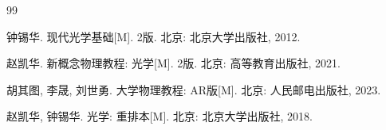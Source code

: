 \documentclass[12pt,a4paper,oneside]{report}
\theoremstyle{definition}
\theoremstyle{remark}
\begin{document}




\begin{thebibliography}{99}

钟锡华. 现代光学基础[M]. 2版. 北京: 北京大学出版社, 2012.

赵凯华. 新概念物理教程: 光学[M]. 2版. 北京: 高等教育出版社, 2021.

胡其图, 李晟, 刘世勇. 大学物理教程: AR版[M]. 北京: 人民邮电出版社, 2023.

赵凯华, 钟锡华. 光学: 重排本[M]. 北京: 北京大学出版社, 2018.

\end{thebibliography}
\end{document}
